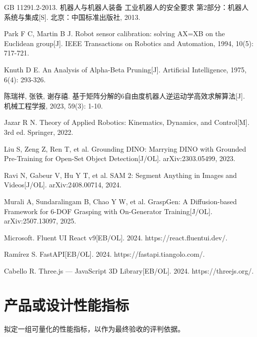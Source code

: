 \documentclass[a4paper, 12pt, oneside]{ctexart}
\begin{document}
{\begin{enumerate}[label={[\arabic*]}, leftmargin=3em, itemsep=0pt, parsep=2pt]
\item GB 11291.2-2013. 机器人与机器人装备 工业机器人的安全要求 第2部分：机器人系统与集成[S]. 北京：中国标准出版社, 2013.
\item Park F C, Martin B J. Robot sensor calibration: solving AX=XB on the Euclidean group[J]. IEEE Transactions on Robotics and Automation, 1994, 10(5): 717-721.
\item Knuth D E. An Analysis of Alpha-Beta Pruning[J]. Artificial Intelligence, 1975, 6(4): 293-326.
\item 陈瑞祥, 张铁, 谢存禧. 基于矩阵分解的6自由度机器人逆运动学高效求解算法[J]. 机械工程学报, 2023, 59(3): 1-10.
\item Jazar R N. Theory of Applied Robotics: Kinematics, Dynamics, and Control[M]. 3rd ed. Springer, 2022.
\item Liu S, Zeng Z, Ren T, et al. Grounding DINO: Marrying DINO with Grounded Pre-Training for Open-Set Object Detection[J/OL]. arXiv:2303.05499, 2023.
\item Ravi N, Gabeur V, Hu Y T, et al. SAM 2: Segment Anything in Images and Videos[J/OL]. arXiv:2408.00714, 2024.
\item Murali A, Sundaralingam B, Chao Y W, et al. GraspGen: A Diffusion-based Framework for 6-DOF Grasping with On-Generator Training[J/OL]. arXiv:2507.13097, 2025.
\item Microsoft. Fluent UI React v9[EB/OL]. 2024. https://react.fluentui.dev/.
\item Ram\'{i}rez S. FastAPI[EB/OL]. 2024. https://fastapi.tiangolo.com/.
\item Cabello R. Three.js --- JavaScript 3D Library[EB/OL]. 2024. https://threejs.org/.
\end{enumerate}
}

\section{产品或设计性能指标}

拟定一组可量化的性能指标，以作为最终验收的评判依据。
\end{document}
